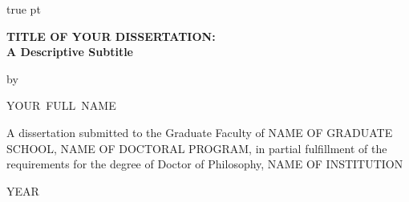 \begin{titlepage}
	\null
	 true pt
	\begin{center}
		{ \Large \bf
			TITLE OF YOUR DISSERTATION: \\
			A Descriptive Subtitle \\
		\par }
		\vskip 2cm
		by \\
		\vskip 1cm
		{ \large
			YOUR~FULL~NAME \\
		\par }
		\vskip 4cm
		{A dissertation submitted to the Graduate Faculty of NAME OF GRADUATE SCHOOL, NAME OF DOCTORAL PROGRAM, in partial fulfillment of the requirements for the degree of Doctor of Philosophy, NAME OF INSTITUTION}

		\vskip 1cm
		YEAR \\

		\vfill
	\end{center}
	\par
	\vfil
\end{titlepage}
